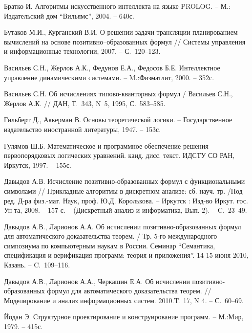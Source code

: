\begin{thebibliography}{99}

%
%

 Братко И. Алгоритмы искусственного интеллекта на языке PROLOG. -- М.: Издательский дом ``Вильямс'', 2004. -- 640с.

 Бутаков М.И., Курганский В.И. О решении задачи трансляции планированием вычислений на основе позитивно--образованных формул // Системы управления и информационные технологии, 2007. -- С.~120--123.

 Васильев С.Н., Жерлов А.К., Федунов Е.А., Федосов Б.Е.  Интеллектное управление динамическими системами. -- M.:Физматлит, 2000. -- 352с.

 Васильев С.Н. Об исчислениях типово-кванторных формул / Васильев С.Н., Жерлов А.К.  // ДАН, Т.~343, N~5, 1995, С.~583--585.

 Гильберт Д., Аккерман В. Основы теоретической логики. -- Государственное издательство иностранной литературы, 1947. -- 153с.

 Гулямов Ш.Б. Математическое и программное обеспечение решения первопорядковых логических уравнений. канд. дисс. текст. ИДСТУ СО РАН, Иркутск, 1997. -- 155с.

 Давыдов А.В. Исчисление позитивно-образованных формул с функциональными символами // Прикладные алгоритмы в дискретном анализе: сб. науч. тр. /Под ред. Д-ра физ.-мат. Наук, проф. Ю.Д. Королькова. – Иркутск : Изд-во Иркут. гос. Ун-та, 2008. – 157 с. – (Дискретный анализ и информатика, Вып. 2). -- C.~23--49.


 Давыдов А.В., Ларионов А.А. Об исчислении позитивно-образованных формул для автоматического доказательства теорем. / Тр. 5-го международного симпозиума по компьютерным наукам в России. Семинар ``Семантика, спецификация и верификация программ: теория и приложения''. 14-15 июня 2010, Казань. -- C.~109--116.

 Давыдов А.В., Ларионов А.А., Черкашин Е.А. Об исчислении позитивно-образованных формул для автоматического доказательства теорем. // Моделирование и анализ информационных систем. 2010.T. 17, N 4. -- С.~60--69.



 Йодан Э. Структурное проектирование и конструирование программ. -- М.:Мир, 1979. -- 415с.


\end{thebibliography}
